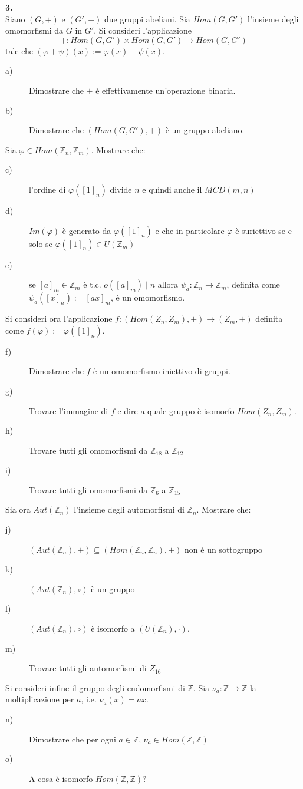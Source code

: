 \documentclass[italian,a4paper,11pt]
{article}
\newcommand{\Z}{\mathbb Z}
\begin{document}
\vspace{0.4 cm}
\noindent
\begin{Ex}\textbf{ 3.}\\
Siano $(G, +)$ e $(G', +)$ due gruppi abeliani. Sia $Hom(G,G')$ l'insieme degli
omomorfismi da $G$ in $G'$. Si consideri l'applicazione
$$ + : Hom(G,G') \times Hom(G,G') \longrightarrow Hom(G,G') $$
tale che $(\varphi + \psi )(x) := \varphi(x) + \psi(x)$.
\begin{description}
\item[a)] Dimostrare che $+$ \`e effettivamente un'operazione binaria.
\item[b)] Dimostrare che $(Hom(G,G'), +)$ \`e un gruppo abeliano.
\end{description}
 Sia $\varphi \in Hom(\Z_n,\Z_m)$. Mostrare che:
\begin{description}
\item[c)] l'ordine di $\varphi([1]_n)$ divide $n$ e quindi anche il $MCD(m, n)$
\item[d)] $Im(\varphi)$ \`e generato da $\varphi([1]_n)$ e che in particolare $\varphi$ \`e suriettivo se e
solo se $\varphi([1]_n) \in U(\Z_m)$
\item[e)] se $[a]_m \in \Z_m$ \`e t.c. $o([a]_m)\mid n$ allora  $\psi_{a} : \Z_n \rightarrow \Z_m$, definita come
 $\psi_{a}([x]_n) := [ax]_m$, \`e un omomorfismo.
\end{description} Si consideri ora l'applicazione $f : (Hom(Z_n,Z_m), +) \rightarrow (Z_m, +)$ definita
come $f(\varphi) := \varphi([1]_n)$.
\begin{description}
\item[f)] Dimostrare che $f$ \`e un omomorfismo iniettivo di gruppi.
\item[g)] Trovare l'immagine di $f$ e dire a quale gruppo \`e isomorfo $Hom(Z_n,Z_m)$.
\item[h)] Trovare tutti gli omomorfismi da $\Z_{18}$ a $\Z_{12}$
\item[i)] Trovare tutti gli omomorfismi da $\Z_6$ a $\Z_{15}$
\end{description}
Sia ora $Aut(\Z_n)$ l'insieme degli automorfismi di $\Z_n$. Mostrare che:
\begin{description}
\item[j)] $(Aut(\Z_n), +) \subseteq (Hom(\Z_n,\Z_n), +)$ non \`e un sottogruppo
\item[k)] $(Aut(\Z_n), \circ)$ \`e un gruppo
\item[l)] $(Aut(\Z_n), \circ)$ \`e isomorfo a $(U(\Z_n), \cdot)$.
\item[m)] Trovare tutti gli automorfismi di $Z_{16}$
\end{description}
Si consideri infine il gruppo degli endomorfismi di $\Z$. Sia $\nu_a : \Z \rightarrow \Z$ la
moltiplicazione per $a$, i.e. $\nu_a(x) = ax$.
\begin{description}
\item[n)] Dimostrare che per ogni $a \in \Z$, $\nu_a \in Hom(\Z,\Z)$
\item[o)] A cosa \`e isomorfo $Hom(\Z,\Z)$?
\end{description}
\end{Ex}
\end{document}
